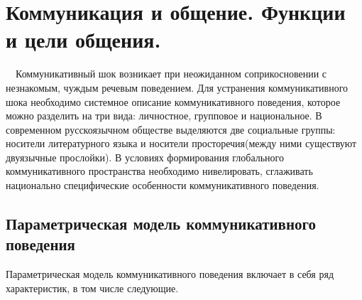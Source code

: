 \section{Коммуникация и общение. Функции и цели общения.}

\ \ Коммуникативный шок возникает при неожиданном соприкосновении с незнакомым, чуждым речевым поведением. Для устранения коммуникативного шока необходимо системное описание коммуникативного поведения, которое можно разделить на три вида: личностное, групповое и национальное. В современном русскоязычном обществе выделяются две социальные группы: носители литературного языка и носители просторечия(между ними существуют двуязычные прослойки). В условиях формирования глобального коммуникативного пространства необходимо нивелировать, сглаживать национально специфические особенности коммуникативного поведения.

\subsection*{Параметрическая модель коммуникативного поведения}
 

Параметрическая модель коммуникативного поведения включает в себя ряд характеристик, в том числе следующие.

